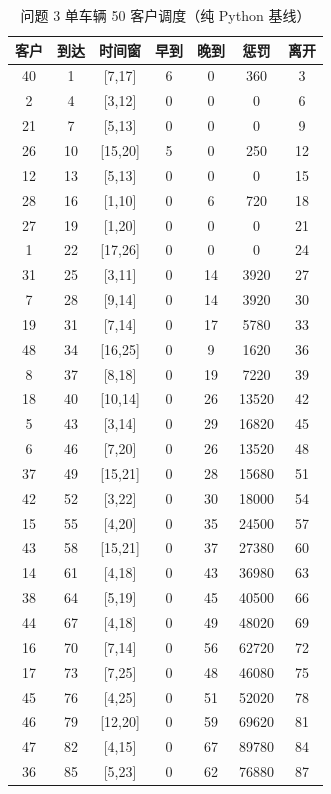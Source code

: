 \begin{table}[htbp]
\centering
\caption{问题 3 单车辆 50 客户调度（纯 Python 基线）}\label{tab:q3_schedule}
\small
\begin{tabular}{ccccccc}
\toprule
客户 & 到达 & 时间窗 & 早到 & 晚到 & 惩罚 & 离开 \\
\midrule
40 & 1 & [7,17] & 6 & 0 & 360 & 3 \\
2 & 4 & [3,12] & 0 & 0 & 0 & 6 \\
21 & 7 & [5,13] & 0 & 0 & 0 & 9 \\
26 & 10 & [15,20] & 5 & 0 & 250 & 12 \\
12 & 13 & [5,13] & 0 & 0 & 0 & 15 \\
28 & 16 & [1,10] & 0 & 6 & 720 & 18 \\
27 & 19 & [1,20] & 0 & 0 & 0 & 21 \\
1 & 22 & [17,26] & 0 & 0 & 0 & 24 \\
31 & 25 & [3,11] & 0 & 14 & 3920 & 27 \\
7 & 28 & [9,14] & 0 & 14 & 3920 & 30 \\
19 & 31 & [7,14] & 0 & 17 & 5780 & 33 \\
48 & 34 & [16,25] & 0 & 9 & 1620 & 36 \\
8 & 37 & [8,18] & 0 & 19 & 7220 & 39 \\
18 & 40 & [10,14] & 0 & 26 & 13520 & 42 \\
5 & 43 & [3,14] & 0 & 29 & 16820 & 45 \\
6 & 46 & [7,20] & 0 & 26 & 13520 & 48 \\
37 & 49 & [15,21] & 0 & 28 & 15680 & 51 \\
42 & 52 & [3,22] & 0 & 30 & 18000 & 54 \\
15 & 55 & [4,20] & 0 & 35 & 24500 & 57 \\
43 & 58 & [15,21] & 0 & 37 & 27380 & 60 \\
14 & 61 & [4,18] & 0 & 43 & 36980 & 63 \\
38 & 64 & [5,19] & 0 & 45 & 40500 & 66 \\
44 & 67 & [4,18] & 0 & 49 & 48020 & 69 \\
16 & 70 & [7,14] & 0 & 56 & 62720 & 72 \\
17 & 73 & [7,25] & 0 & 48 & 46080 & 75 \\
45 & 76 & [4,25] & 0 & 51 & 52020 & 78 \\
46 & 79 & [12,20] & 0 & 59 & 69620 & 81 \\
47 & 82 & [4,15] & 0 & 67 & 89780 & 84 \\
36 & 85 & [5,23] & 0 & 62 & 76880 & 87 \\

\end{tabular}
\end{table}
